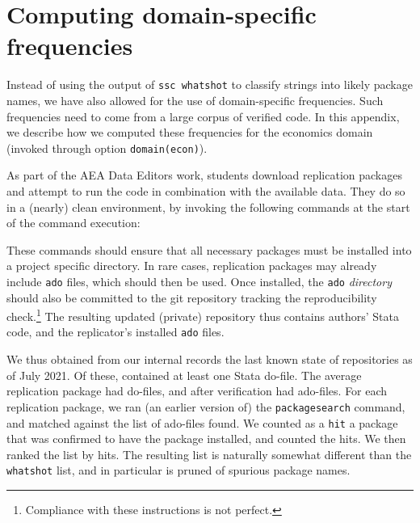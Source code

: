 
\newpage
\appendix

\section{Computing domain-specific frequencies}


Instead of using the output of \texttt{ssc whatshot} to classify strings into likely package names, we have also allowed for the use of domain-specific frequencies. Such frequencies need to come from a large corpus of verified code. In this appendix, we describe how we computed these frequencies for the economics domain (invoked through option \texttt{domain(econ)}).

As part of the AEA Data Editors work, students download replication packages and attempt to run the code in combination with the available data. They do so in a (nearly) clean environment, by invoking the following commands at the start of the command execution:

\begin{stlog}
\nullskip
\end{stlog}

These commands should ensure that all necessary packages must be installed into a project specific directory. In rare cases, replication packages may already include \texttt{ado} files, which should then be used. Once installed, the \texttt{ado} \textit{directory} should also be committed to the git repository tracking the reproducibility check.\footnote{Compliance with these instructions is not perfect.} The resulting updated (private) repository thus contains authors' Stata code, and the replicator's installed \texttt{ado} files. 

We thus obtained from our internal records the last known state of \anaearep{} repositories as of July 2021. Of these, \anaearepp{} contained at least one Stata do-file. The average replication package had \adocount{} do-files, and after verification had \aadocount{} ado-files. For each replication package, we ran (an earlier version of) the \texttt{packagesearch} command, and matched against the list of ado-files found. We counted as a \texttt{hit} a package that was confirmed to have the package installed, and counted the hits. We then ranked the list by hits. The resulting list is naturally somewhat different than the \texttt{whatshot} list, and in particular is pruned of spurious package names. 

